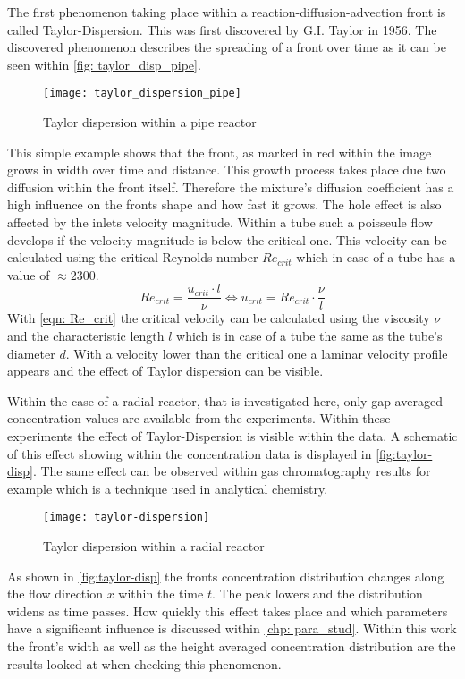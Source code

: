 \documentclass[../thesis.tex]{subfiles}
\begin{document}
The first phenomenon taking place within a reaction-diffusion-advection front is called Taylor-Dispersion. This was first discovered by G.I. Taylor\cite{aris1956dispersion} in 1956. The discovered phenomenon describes the spreading of a front over time as it can be seen within \autoref{fig: taylor_disp_pipe}. 
\begin{figure}[htbp]
	\centering
	\texttt{[image: taylor\_dispersion\_pipe]}
	\caption{Taylor dispersion within a pipe reactor}
	\label{fig: taylor_disp_pipe}
\end{figure}
This simple example shows that the front, as marked in red within the image grows in width over time and distance. This growth process takes place due two diffusion within the front itself. Therefore the mixture's diffusion coefficient has a high influence on the fronts shape and how fast it grows. The hole effect is also affected by the inlets velocity magnitude. Within a tube such a poisseule flow develops if the velocity magnitude is below the critical one. This velocity can be calculated using the critical Reynolds number $Re_{crit}$ which in case of a tube has a value of $\approx 2300$. 
\begin{equation}
	\label{eqn: Re_crit}
	Re_{crit} = \dfrac{u_{crit} \cdot l}{\nu} \Leftrightarrow u_{crit} = Re_{crit} \cdot \dfrac{\nu}{l}
\end{equation}
With \autoref{eqn: Re_crit} the critical velocity can be calculated using the viscosity $\nu$ and the characteristic length $l$ which is in case of a tube the same as the tube's diameter $d$. With a velocity lower than the critical one a laminar velocity profile appears and the effect of Taylor dispersion can be visible.

Within the case of a radial reactor, that is investigated here, only gap averaged concentration values are available from the experiments. Within these experiments the effect of Taylor-Dispersion is visible within the data. A schematic \cite{levenspiel1998chemical} of this effect showing within the concentration data is displayed in \autoref{fig:taylor-disp}. The same effect can be observed within gas chromatography results for example which is a technique used in analytical chemistry.
\begin{figure}[htbp]
	\centering
	\texttt{[image: taylor-dispersion]}
	\caption{Taylor dispersion within a radial reactor \cite{levenspiel1998chemical}}
	\label{fig:taylor-disp}
\end{figure}

As shown in \autoref{fig:taylor-disp} the fronts concentration distribution changes along the flow direction $x$ within the time $t$. The peak lowers and the distribution widens as time passes. How quickly this effect takes place and which parameters have a significant influence is discussed within \autoref{chp: para_stud}. Within this work the front's width as well as the height averaged concentration distribution are the results looked at when checking this phenomenon.
\end{document}

